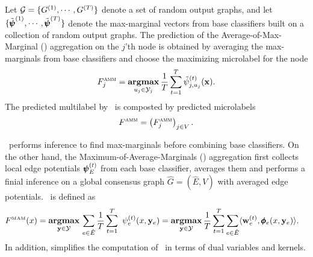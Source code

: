 {%
Let $\mathcal{G}=\{G^{(1)},\cdots,G^{(T)}\}$ denote a set of random output graphs, and let $\{\tilde{\pmb \psi}^{(1)},\cdots,\tilde{\pmb \psi}^{(T)}\}$ denote the max-marginal vectors from base classifiers built on a collection of random output graphs.
The prediction of the Average-of-Max-Marginal (\amm) aggregation on the $j$'th node is obtained by averaging the max-marginals from base classifiers and choose the maximizing microlabel for the node 
\begin{align*}
	F_j^{\text{{\sc amm}}}=\underset{u_j\in\mathcal{Y}_j}{\textbf{argmax}}\,\frac{1}{T}\sum_{t=1}^{T}\tilde{\psi}_{j,u_j}^{(t)}(\mathbf {x}).	\end{align*}
The predicted multilabel by \amm\ is composted by predicted microlabels
\begin{align*}
	F^{\text{{\sc amm}}}=\left(F_j^{\text{{\sc amm}}}\right)_{j\in V}.
\end{align*}

\amm\ performs inference to find max-marginals before combining base classifiers. 
On the other hand, the Maximum-of-Average-Marginals (\mam) aggregation first collects local edge potentials $\pmb \psi_E^{(t)}$ from each base classifier, averages them and performs a finial inference on a global consensus graph $\hat{G}=(\hat{E},V)$ with averaged edge potentials.
\mam\ is defined as
\begin{align*}
	F^{\text{\tiny MAM}}(x) &= \underset{\vy \in \Ycal }{\argmax}\,\sum_{e\in \hat{E}}\frac{1}{T}\sum_{t=1}^{T}\ \psi^{(t)}_e(x,\vy_e)
	= \underset{\vy \in \Ycal}{\argmax}\, \frac{1}{T} \sum_{t=1}^T \sum_{e\in \hat{E}} \ip{\vw_e^{(t)}}{\phib_e(x,\vy_e)}. %
\end{align*}
In addition,  simplifies the computation of \mam\ in terms of dual variables and kernels.

}

